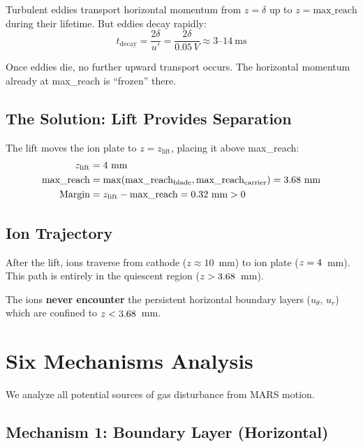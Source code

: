 \documentclass[11pt,a4paper]{article}
\begin{document}
Turbulent eddies transport horizontal momentum from $z = \delta$ up to
$z = \mathrm{max\_reach}$ during their lifetime. But eddies decay rapidly:
\begin{equation}
  t_\mathrm{decay} = \frac{2\delta}{u'} = \frac{2\delta}{0.05\,V} \approx 3\text{--}14~\text{ms}
\end{equation}

Once eddies die, no further upward transport occurs. The horizontal momentum
already at max\_reach is ``frozen'' there.

\subsection{The Solution: Lift Provides Separation}

The lift moves the ion plate to $z = z_\mathrm{lift}$, placing it above max\_reach:
\begin{align}
  z_\mathrm{lift} &= 4~\text{mm} \\
  \mathrm{max\_reach} &= \max(\mathrm{max\_reach}_\mathrm{blade}, \mathrm{max\_reach}_\mathrm{carrier})
    = 3.68~\text{mm} \\
  \text{Margin} &= z_\mathrm{lift} - \mathrm{max\_reach} = 0.32~\text{mm} > 0
\end{align}

\subsection{Ion Trajectory}

After the lift, ions traverse from cathode ($z \approx 10$~mm) to ion plate
($z = 4$~mm). This path is entirely in the quiescent region ($z > 3.68$~mm).

The ions \textbf{never encounter} the persistent horizontal boundary layers
($u_\theta$, $u_r$) which are confined to $z < 3.68$~mm.

\section{Six Mechanisms Analysis}
\label{sec:mechanisms}

We analyze all potential sources of gas disturbance from MARS motion.

\subsection{Mechanism 1: Boundary Layer (Horizontal)}
\end{document}
